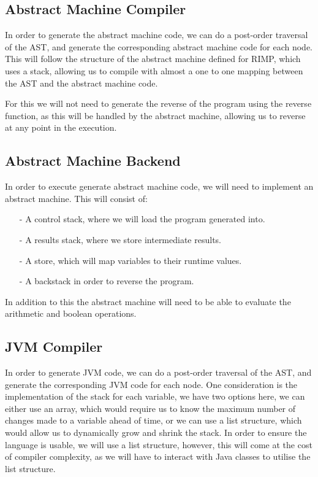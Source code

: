 \subsection*{Abstract Machine Compiler}
In order to generate the abstract machine code, we can do a post-order traversal of the AST, and generate the corresponding abstract machine code for each node.
This will follow the structure of the abstract machine defined for RIMP\cite{RIMP}, which uses a stack, allowing us to compile with almost a one to one mapping between the AST and the abstract machine code.

For this we will not need to generate the reverse of the program using the reverse function, as this will be handled by the abstract machine, allowing us to reverse at any point in the execution.

\subsection*{Abstract Machine Backend}
In order to execute generate abstract machine code, we will need to implement an abstract machine.
This will consist of:
\begin{itemize}
    \item[-] A control stack, where we will load the program generated into.
    \item[-] A results stack, where we store intermediate results.
    \item[-] A store, which will map variables to their runtime values.
    \item[-] A backstack in order to reverse the program.
\end{itemize}
In addition to this the abstract machine will need to be able to evaluate the arithmetic and boolean operations.

\subsection*{JVM Compiler}
In order to generate JVM code, we can do a post-order traversal of the AST, and generate the corresponding JVM code for each node.
One consideration is the implementation of the stack for each variable, we have two options here, we can either use an array, which would require us to know the maximum number of changes made to a variable ahead of time, or we can use a list structure, which would allow us to dynamically grow and shrink the stack.
In order to ensure the language is usable, we will use a list structure, however, this will come at the cost of compiler complexity, as we will have to interact with Java classes to utilise the list structure.


